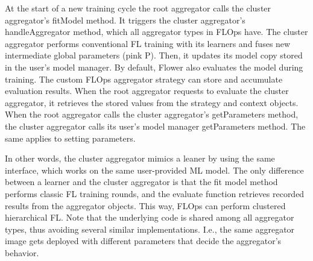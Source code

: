 At the start of a new training cycle the root aggregator calls the cluster aggregator's fitModel method.
It triggers the cluster aggregator's handleAggregator method, which all aggregator types in FLOps have.
The cluster aggregator performs conventional FL training with its learners and fuses new intermediate global parameters (pink P).
Then, it updates its model copy stored in the user's model manager.
By default, Flower also evaluates the model during training. The custom FLOps aggregator strategy can store and accumulate evaluation results.
When the root aggregator requests to evaluate the cluster aggregator, it retrieves the stored values from the strategy and context objects.
When the root aggregator calls the cluster aggregator's getParameters method, the cluster aggregator calls its user's model manager getParameters method.
The same applies to setting parameters.

In other words, the cluster aggregator mimics a leaner by using the same interface, which works on the same user-provided ML model.
The only difference between a learner and the cluster aggregator is that the fit model method performs classic FL training rounds, and the evaluate function retrieves recorded results from the aggregator objects.
This way, FLOps can perform clustered hierarchical FL.
Note that the underlying code is shared among all aggregator types, thus avoiding several similar implementations.
I.e., the same aggregator image gets deployed with different parameters that decide the aggregator's behavior.
